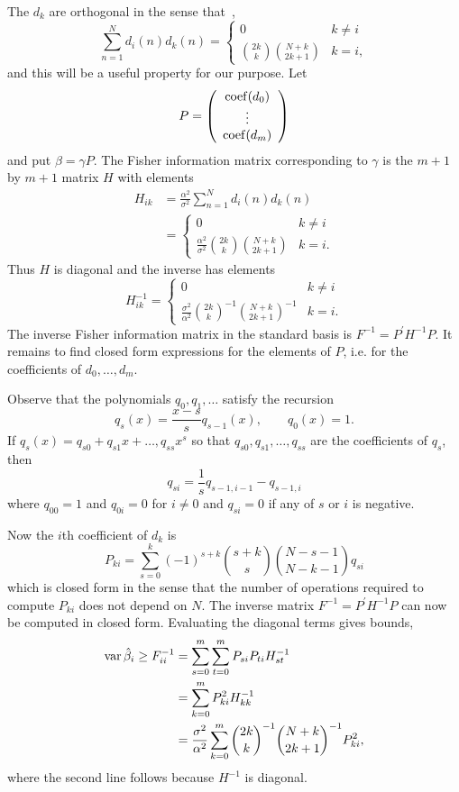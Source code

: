 \documentclass[5p]{elsarticle}
\begin{document}
The $d_k$ are orthogonal in the sense that~\cite{Eisinberg2007_discerete_otho_poly_equidist},
\[
\sum_{n=1}^{N}{ d_i(n) d_k(n) } = \begin{cases}
0 &  k\neq i \\
\binom{2k}{k} \binom{N+k}{2k+1}  & k = i,
\end{cases}
\]
and this will be a useful property for our purpose.  Let 
\[
P = \left( \begin{array}{c}
\operatorname{coef}(d_0) \\
\vdots \\
\operatorname{coef}(d_m)
\end{array} \right)
\]
and put $\beta = \gamma P$.  The Fisher information matrix corresponding to $\gamma$ is the $m+1$ by $m+1$ matrix $H$ with elements
\begin{align*}
H_{ik} &= \frac{\alpha^2}{\sigma^2}\sum_{n=1}^{N} d_{i}(n) d_{k}(n) \\
&= \begin{cases}
0 &  k\neq i \\
 \frac{\alpha^2}{\sigma^2} \binom{2k}{k} \binom{N+k}{2k+1}  & k = i.
\end{cases}
\end{align*}
Thus $H$ is diagonal and the inverse has elements
\[
H_{ik}^{-1} = \begin{cases}
0 &  k\neq i \\
 \frac{\sigma^2}{\alpha^2} \binom{2k}{k}^{-1} \binom{N+k}{2k+1}^{-1}  & k = i.
\end{cases}
\] 
The inverse Fisher information matrix in the standard basis is $F^{-1} = P^\prime H^{-1} P$.  It remains to find closed form expressions for the elements of $P$, i.e. for the coefficients of $d_0,\dots,d_m$.  

Observe that the polynomials $q_0,q_1,\dots$ satisfy the recursion
\[
q_s(x) = \frac{x-s}{s} q_{s-1}(x), \qquad q_{0}(x) = 1.
\]
If $q_s(x) = q_{s0} + q_{s1}x + \dots, q_{ss}x^s$ so that $q_{s0},q_{s1},\dots,q_{ss}$ are the coefficients of $q_{s}$, then
\[
q_{si} = \frac{1}{s}q_{s-1,i-1} - q_{s-1,i}
\]
where $q_{00}=1$ and $q_{0i}=0$ for $i \neq 0$ and $q_{si} = 0$ if any of $s$ or $i$ is negative.

Now the $i$th coefficient of $d_k$ is
\[
P_{ki} = \sum_{s=0}^k{(-1)^{s+k}\binom{s+k}{s}\binom{N-s-1}{N-k-1}q_{si}}
\]  
which is closed form in the sense that the number of operations required to compute $P_{ki}$ does not depend on $N$.  The inverse matrix $F^{-1} = P^\prime H^{-1} P$ can now be computed in closed form.  Evaluating the diagonal terms gives bounds,
\begin{align*}
\operatorname{var} \hat{\beta}_i \geq F_{ii}^{-1} &=  \sum_{s=0}^{m}\sum_{t=0}^{m} P_{si} P_{ti}  H_{st}^{-1} \\
&=  \sum_{k=0}^{m} P_{ki}^2  H_{kk}^{-1} \\
&= \frac{\sigma^2}{\alpha^2} \sum_{k=0}^{m} \binom{2k}{k}^{-1} \binom{N+k}{2k+1}^{-1} P_{ki}^2,
\end{align*}
where the second line follows because $H^{-1}$ is diagonal.
 
\end{document}
